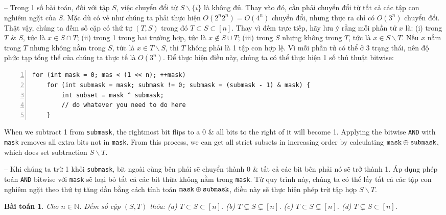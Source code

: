 \documentclass{article}
\newtheorem{baitoan}{Bài toán}
\begin{document}
-- Trong 1 số bài toán, đối với tập $S$, việc chuyển đổi từ $S\backslash\{i\}$ là không đủ. Thay vào đó, cần phải chuyển đổi từ tất cả các tập con nghiêm ngặt của $S$. Mặc dù có vẻ như chúng ta phải thực hiện $O(2^n2^n) = O(4^n)$ chuyển đổi, nhưng thực ra chỉ có $O(3^n)$ chuyển đổi. Thật vậy, chúng ta đếm số cặp có thứ tự $(T,S)$ trong đó $T\subset S\subset[n]$. Thay vì đếm trực tiếp, hãy lưu ý rằng mỗi phần tử $x$ là: (i) trong $T$ \& $S$, tức là $x\in S\cap T$; (ii) trong 1 trong hai trường hợp, tức là $x\notin S\cup T$; (iii) trong $S$ nhưng không trong $T$, tức là $x\in S\backslash T$. Nếu $x$ nằm trong $T$ nhưng không nằm trong $S$, tức là $x\in T\backslash S$, thì $T$ không phải là 1 tập con hợp lệ. Vì mỗi phần tử có thể ở 3 trạng thái, nên độ phức tạp tổng thể của chúng ta thực tế là $O(3^n)$. Để thực hiện điều này, chúng ta có thể thực hiện 1 số thủ thuật bitwise:
\begin{Verbatim}[numbers=left,xleftmargin=5mm]
for (int mask = 0; mas < (1 << n); ++mask)
    for (int submask = mask; submask != 0; submask = (submask - 1) & mask) {
        int subset = mask ^ submask;
        // do whatever you need to do here
    }
\end{Verbatim}
When we subtract 1 from {\tt submask}, the rightmost bit flips to a 0 \& all bits to the right of it will become 1. Applying the bitwise {\tt AND} with {\tt mask} removes all extra bits not in {\tt mask}. From this process, we can get all strict subsets in increasing order by calculating ${\tt mask}\oplus{\tt submask}$, which does set subtraction $S\backslash T$.

-- Khi chúng ta trừ 1 khỏi {\tt submask}, bit ngoài cùng bên phải sẽ chuyển thành 0 \& tất cả các bit bên phải nó sẽ trở thành 1. Áp dụng phép toán {\tt AND} bitwise với {\tt mask} sẽ loại bỏ tất cả các bit thừa không nằm trong {\tt mask}. Từ quy trình này, chúng ta có thể lấy tất cả các tập con nghiêm ngặt theo thứ tự tăng dần bằng cách tính toán ${\tt mask}\oplus{\tt submask}$, điều này sẽ thực hiện phép trừ tập hợp $S\backslash T$.

\begin{baitoan}
    Cho $n\in\mathbb{N}$. Đếm số cặp $(S,T)$ thỏa: (a) $T\subset S\subset[n]$. (b) $T\subsetneq S\subsetneq[n]$. (c) $T\subset S\subsetneq[n]$. (d) $T\subsetneq S\subset[n]$.
\end{baitoan}
\end{document}
